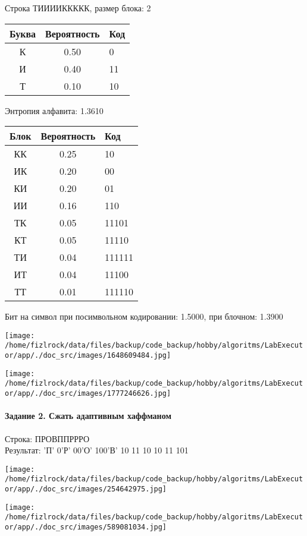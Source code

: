\documentclass[a4paper, 12pt]{article}
\begin{document}
Строка ТИИИИККККК, размер блока: 2
\begin{center}
 \begin{tabular}{ |c|c|l| } 
  \hline
     Буква & Вероятность & Код\\ \hline
К & 0.50 & 0\\\hline
И & 0.40 & 11\\\hline
Т & 0.10 & 10
\\ \hline \end{tabular}
\end{center}
Энтропия алфавита: 1.3610
\begin{center}
 \begin{tabular}{ |c|c|l| } 
  \hline
     Блок & Вероятность & Код\\ \hline
КК & 0.25 & 10\\\hline
ИК & 0.20 & 00\\\hline
КИ & 0.20 & 01\\\hline
ИИ & 0.16 & 110\\\hline
ТК & 0.05 & 11101\\\hline
КТ & 0.05 & 11110\\\hline
ТИ & 0.04 & 111111\\\hline
ИТ & 0.04 & 11100\\\hline
ТТ & 0.01 & 111110
\\ \hline \end{tabular}
\end{center}
Бит на символ при посимвольном кодировании: 1.5000, при блочном: 1.3900

\texttt{[image: /home/fizlrock/data/files/backup/code\_backup/hobby/algoritms/LabExecutor/app/./doc\_src/images/1648609484.jpg]}

\texttt{[image: /home/fizlrock/data/files/backup/code\_backup/hobby/algoritms/LabExecutor/app/./doc\_src/images/1777246626.jpg]}
\pagebreak
\paragraph{Задание 2. Сжать адаптивным хаффманом\\}

Строка: 
ПРОВППРРРО\\
Результат: 'П' 0'Р' 00'О' 100'В' 10 11 10 10 11 101

\texttt{[image: /home/fizlrock/data/files/backup/code\_backup/hobby/algoritms/LabExecutor/app/./doc\_src/images/254642975.jpg]}

\texttt{[image: /home/fizlrock/data/files/backup/code\_backup/hobby/algoritms/LabExecutor/app/./doc\_src/images/589081034.jpg]}
\end{document}
